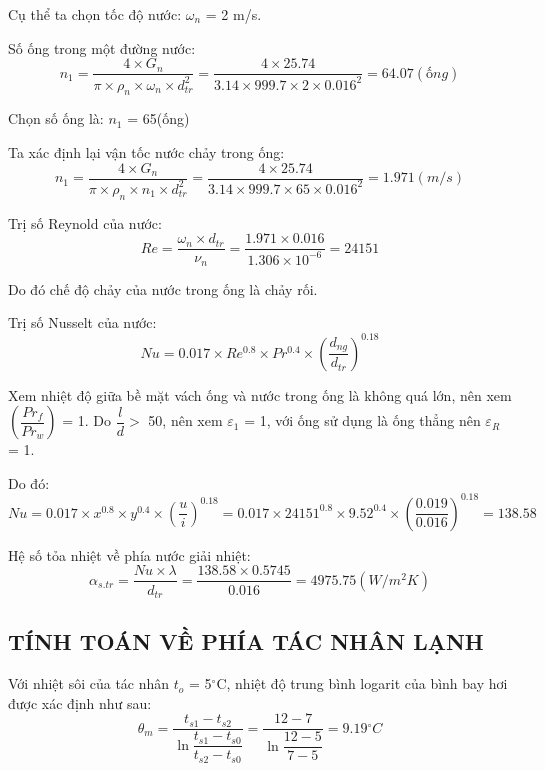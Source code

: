 Cụ thể ta chọn tốc độ nước: $\omega_{n}$ = 2 m/s.

Số ống trong một đường nước:
\begin{equation*}
	n_{1} = \dfrac{4\times G_{n}}{\pi\times\rho_{n}\times\omega_{n}\times d_{tr}^2} = \dfrac{4 \times 25.74}{3.14 \times 999.7 \times 2 \times 0.016^2}=64.07(ống)
\end{equation*}

Chọn số ống là: $n_{1}$  = 65(ống)

Ta xác định lại vận tốc nước chảy trong ống:
\begin{equation*}
	n_{1} = \dfrac{4\times G_{n}}{\pi\times\rho_{n}\times n_{1}\times d_{tr}^2} = \dfrac{4 \times 25.74}{3.14 \times 999.7 \times 65 \times 0.016^2}=1.971(m/s)
\end{equation*}

Trị số Reynold của nước:
\begin{equation*}
	Re = \dfrac{\omega_{n}\times d_{tr}}{\nu_{n}} = \dfrac{1.971 \times 0.016}{1.306 \times 10^{-6}}=24151
\end{equation*}

Do đó chế độ chảy của nước trong ống là chảy rối.

Trị số Nusselt của nước:
\begin{equation*}
	Nu = 0.017\times Re^{0.8}\times Pr^{0.4}\times\left(\dfrac{d_{ng}}{d_{tr}}\right)^{0.18} 
\end{equation*}

Xem nhiệt độ giữa bề mặt vách ống và nước trong ống là không quá lớn, nên xem $\left(\dfrac{Pr_{f}}{Pr_{w}}\right)$ = 1. Do $\dfrac{l}{d} >$ 50, nên xem $\varepsilon_{1}$ = 1, với ống sử dụng là ống thẳng nên $\varepsilon_{R}$ = 1.

Do đó:
\begin{equation*}
	Nu = 0.017\times x^{0.8}\times y^{0.4}\times\left(\dfrac{u}{i}\right)^{0.18} = 0.017 \times 24151^{0.8} \times 9.52^{0.4} \times (\dfrac{0.019}{0.016})^{0.18}=138.58
\end{equation*}

Hệ số tỏa nhiệt về phía nước giải nhiệt:
\begin{equation*}
	\alpha_{s.tr} = \dfrac{Nu\times\lambda}{d_{tr}} =\dfrac{138.58 \times 0.5745}{0.016}=4975.75(W/m^2K)
\end{equation*}

\subsection{TÍNH TOÁN VỀ PHÍA TÁC NHÂN LẠNH}
Với nhiệt sôi của tác nhân $t_{o}$ = 5$^{\circ}$C, nhiệt độ trung bình logarit của bình bay hơi được xác định như sau:
\begin{equation*}
	\theta_{m} = \dfrac{t_{s1} - t_{s2}}{\ln{\dfrac{t_{s1} - t_{s0}}{t_{s2} - t_{s0}}}} = \dfrac{12-7}{\ln{\dfrac{12-5}{7-5}}}=9.19{^\circ}C
\end{equation*}

